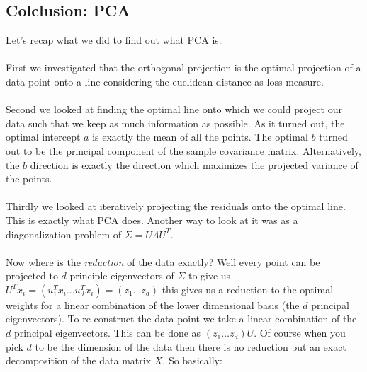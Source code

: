 \subsection{Colclusion: PCA}
Let's recap what we did to find out what PCA is.
\\\\
First we investigated that the orthogonal projection
is the optimal projection of a data point onto a line
considering the euclidean distance as loss measure.
\\\\
Second we looked at finding the optimal line onto which
we could project our data such that we keep as much
information as possible. As it turned out, the optimal
intercept $a$ is exactly the mean of all the points.
The optimal $b$ turned out to be the principal component
of the sample covariance matrix. Alternatively, the $b$
direction is exactly the direction which maximizes the 
projected variance of the points.
\\\\
Thirdly we looked at iteratively projecting the residuals
onto the optimal line. This is exactly what PCA does.
Another way to look at it was as a diagonalization 
problem of $\Sigma = U\Lambda U^T$.
\\\\
Now where is the \textit{reduction} of the data exactly? 
Well every point can be projected to $d$ principle 
eigenvectors of $\Sigma$ to give us $U^T x_i = 
(u_1^Tx_i \dots u_d^Tx_i) = (z_1 \dots z_d)$ this gives 
us a reduction to the optimal weights for a linear combination 
of the lower dimensional basis (the $d$ principal eigenvectors). 
To re-construct the data point we take a linear combination of 
the $d$ principal eigenvectors. This can be done as 
$(z_1 \dots z_d)U$. Of course when you pick $d$ to be the 
dimension of the data then there is no reduction but an 
exact decomposition of the data matrix $X$. So basically:

